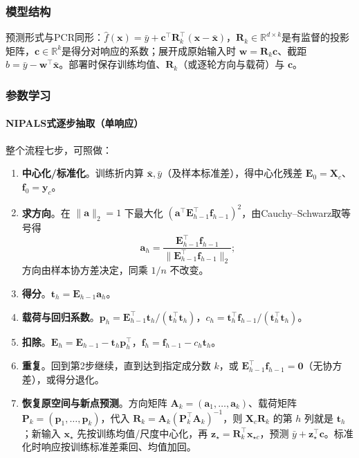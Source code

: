 \subsubsection{模型结构}
\label{sec:regression-pls-structure}

预测形式与PCR同形：$\widehat f(\bm{x})=\bar y+\bm{c}^{\top}\bm{R}_k^{\top}(\bm{x}-\bar{\bm{x}})$，$\bm{R}_k\in\mathbb R^{d\times k}$是有监督的投影矩阵，$\bm{c}\in\mathbb R^k$是得分对响应的系数；展开成原始输入时 $\bm{w}=\bm{R}_k\bm{c}$、截距 $b=\bar y-\bm{w}^{\top}\bar{\bm{x}}$。部署时保存训练均值、$\bm{R}_k$（或逐轮方向与载荷）与 $\bm{c}$。

\subsubsection{参数学习}
\label{sec:regression-pls-learning}

\paragraph{NIPALS式逐步抽取（单响应）}

整个流程七步，可照做：

\begin{enumerate}
  \item \textbf{中心化/标准化}。训练折内算 $\bar{\bm{x}},\bar y$（及样本标准差），得中心化残差 $\bm E_0=\bm X_c$、$\bm f_0=\bm y_c$。
  \item \textbf{求方向}。在 $\|\bm{a}\|_2=1$ 下最大化 $(\bm{a}^{\top}\bm E_{h-1}^{\top}\bm f_{h-1})^2$，由Cauchy--Schwarz取等号得
  \[
    \bm{a}_h=\frac{\bm E_{h-1}^{\top}\bm f_{h-1}}{\lVert\bm E_{h-1}^{\top}\bm f_{h-1}\rVert_2};
  \]
  方向由样本协方差决定，同乘 $1/n$ 不改变。
  \item \textbf{得分}。$\bm t_h=\bm E_{h-1}\bm a_h$。
  \item \textbf{载荷与回归系数}。$\bm p_h=\bm E_{h-1}^{\top}\bm t_h/(\bm t_h^{\top}\bm t_h)$，$c_h=\bm t_h^{\top}\bm f_{h-1}/(\bm t_h^{\top}\bm t_h)$。
  \item \textbf{扣除}。$\bm E_h=\bm E_{h-1}-\bm t_h\bm p_h^{\top}$，$\bm f_h=\bm f_{h-1}-c_h\bm t_h$。
  \item \textbf{重复}。回到第2步继续，直到达到指定成分数 $k$，或 $\bm E_{h-1}^{\top}\bm f_{h-1}=\bm 0$（无协方差），或得分退化。
  \item \textbf{恢复原空间与新点预测}。方向矩阵 $\bm A_k=(\bm a_1,\ldots,\bm a_k)$、载荷矩阵 $\bm P_k=(\bm p_1,\ldots,\bm p_k)$，代入 $\bm R_k=\bm A_k(\bm P_k^{\top}\bm A_k)^{-1}$，则 $\bm X_c\bm R_k$ 的第 $h$ 列就是 $\bm t_h$；新输入 $\bm x_\star$ 先按训练均值/尺度中心化，再 $\bm z_\star=\bm R_k^{\top}\bm x_{\star c}$，预测 $\bar y+\bm z_\star^{\top}\bm c$。标准化时响应按训练标准差乘回、均值加回。
\end{enumerate}

